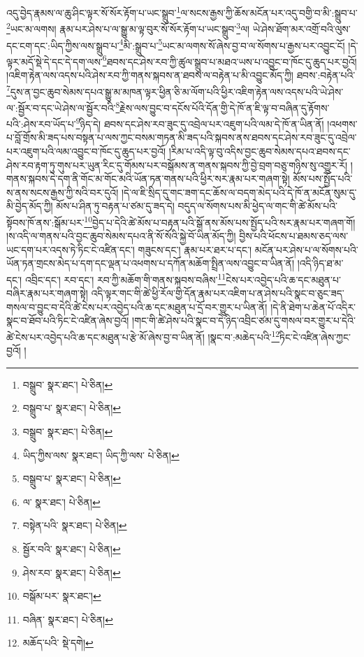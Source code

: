 འདུ་བྱེད་རྣམས་ལ་ཆུ་ཤིང་ལྟར་སོ་སོར་རྟོག་པ་ཡང་སྒྲུབ་\footnote{བསྒྲུབ་  སྣར་ཐང་།  པེ་ཅིན། }ལ་སངས་རྒྱས་ཀྱི་ཆོས་མངོན་པར་འདུ་བགྱི་བ་མི་:སྒྲུབ་པ་\footnote{བསྒྲུབ་པ་  སྣར་ཐང་།  པེ་ཅིན། }ཡང་མ་ལགས། རྣམ་པར་ཤེས་པ་ལ་སྒྱུ་མ་ལྟ་བུར་སོ་སོར་རྟོག་པ་ཡང་སྒྲུབ་\footnote{བསྒྲུབ་  སྣར་ཐང་།  པེ་ཅིན། }ལ། ཡེ་ཤེས་ཐོག་མར་འགྲོ་བའི་ལུས་དང་ངག་དང་:ཡིད་ཀྱིས་ལས་སྒྲུབ་པ་\footnote{ཡིད་ཀྱིས་ལས་  སྣར་ཐང་། ཡིད་ཀྱི་ལས་  པེ་ཅིན། }མི་:སྒྲུབ་པ་\footnote{བསྒྲུབ་པ་  སྣར་ཐང་།  པེ་ཅིན། }ཡང་མ་ལགས་སོ་ཞེས་བྱ་བ་ལ་སོགས་པ་རྒྱས་པར་འབྱུང་ངོ། །དེ་ལྟར་མདོ་སྡེ་དེ་དང་དེ་དག་ལས་\footnote{ལ་  སྣར་ཐང་།  པེ་ཅིན། }ཐབས་དང་ཤེས་རབ་ཀྱི་ཚུལ་སྒྲུབ་པ་མཐའ་ཡས་པ་འབྱུང་བ་ཁོང་དུ་ཆུད་པར་བྱའོ། །འཇིག་རྟེན་ལས་འདས་པའི་ཤེས་རབ་ཀྱི་གནས་སྐབས་ན་ཐབས་ལ་བརྟེན་པ་མི་འབྱུང་མོད་ཀྱི། ཐབས་:བརྟེན་པའི་\footnote{བསྟེན་པའི་  སྣར་ཐང་།  པེ་ཅིན། }དུས་ན་བྱང་ཆུབ་སེམས་དཔའ་སྒྱུ་མ་མཁན་ལྟར་ཕྱིན་ཅི་མ་ལོག་པའི་ཕྱིར་འཇིག་རྟེན་ལས་འདས་པའི་ཡེ་ཤེས་ལ་:སྦྱོར་བ་དང་ཡེ་ཤེས་ལ་སྦྱོར་བའི་\footnote{སྦྱོར་བའི་  སྣར་ཐང་།  པེ་ཅིན། }རྗེས་ལས་བྱུང་བ་དངོས་པོའི་དོན་གྱི་དེ་ཁོ་ན་ཇི་ལྟ་བ་བཞིན་དུ་རྟོགས་པའི་:ཤེས་རབ་ཡོད་པ་\footnote{ཤེས་རབ་  སྣར་ཐང་།  པེ་ཅིན། }ཉིད་དེ། ཐབས་དང་ཤེས་རབ་ཟུང་དུ་འབྲེལ་པར་འཇུག་པའི་ལམ་དེ་ཁོ་ན་ཡིན་ནོ། །འཕགས་པ་བློ་གྲོས་མི་ཟད་པས་བསྟན་པ་ལས་ཀྱང་བསམ་གཏན་མི་ཟད་པའི་སྐབས་ནས་ཐབས་དང་ཤེས་རབ་ཟུང་དུ་འབྲེལ་པར་འཇུག་པའི་ལམ་འབྱུང་བ་ཁོང་དུ་ཆུད་པར་བྱའོ། །རིམ་པ་འདི་ལྟ་བུ་འདིས་བྱང་ཆུབ་སེམས་དཔའ་ཐབས་དང་ཤེས་རབ་རྟག་ཏུ་གུས་པར་ཡུན་རིང་དུ་གོམས་པར་བསྒོམས་ན་གནས་སྐབས་ཀྱི་བྱེ་བྲག་བཅུ་གཉིས་སུ་འགྱུར་རོ། །གནས་སྐབས་དེ་དག་ནི་གོང་མ་གོང་མའི་ཡོན་ཏན་གནས་པའི་ཕྱིར་སར་རྣམ་པར་གཞག་སྟེ། མོས་པས་སྤྱོད་པའི་ས་ནས་སངས་རྒྱས་ཀྱི་སའི་བར་དུའོ། །དེ་ལ་ཇི་སྲིད་དུ་གང་ཟག་དང་ཆོས་ལ་བདག་མེད་པའི་དེ་ཁོ་ན་མངོན་སུམ་དུ་མི་བྱེད་མོད་ཀྱི། མོས་པ་ཤིན་ཏུ་བརྟན་པ་ཙམ་དུ་ཟད་དེ། བདུད་ལ་སོགས་པས་མི་ཕྱེད་ལ་གང་གི་ཚེ་མོས་པའི་སྟོབས་ཁོ་ནས་:སྒོམ་པར་\footnote{བསྒོམ་པར་  སྣར་ཐང་། }བྱེད་པ་དེའི་ཚེ་མོས་པ་བརྟན་པའི་སྒོ་ནས་མོས་པས་སྤྱོད་པའི་སར་རྣམ་པར་གཞག་གོ། །ས་འདི་ལ་གནས་པའི་བྱང་ཆུབ་སེམས་དཔའ་ནི་སོ་སོའི་སྐྱེ་བོ་ཡིན་མོད་ཀྱི། བྱིས་པའི་ཕོངས་པ་ཐམས་ཅད་ལས་ཡང་དག་པར་འདས་ཏེ་ཏིང་ངེ་འཛིན་དང་། གཟུངས་དང་། རྣམ་པར་ཐར་པ་དང་། མངོན་པར་ཤེས་པ་ལ་སོགས་པའི་ཡོན་ཏན་གྲངས་མེད་པ་དག་དང་ལྡན་པ་འཕགས་པ་དཀོན་མཆོག་སྤྲིན་ལས་འབྱུང་བ་ཡིན་ནོ། །འདི་ཉིད་ཐ་མ་དང་། འབྲིང་དང་། རབ་དང་། རབ་ཀྱི་མཆོག་གི་གནས་སྐབས་བཞིས་\footnote{བཞིན་  སྣར་ཐང་།  པེ་ཅིན། }ངེས་པར་འབྱེད་པའི་ཆ་དང་མཐུན་པ་བཞིར་རྣམ་པར་གཞག་སྟེ། འདི་ལྟར་གང་གི་ཚེ་ཕྱི་རོལ་གྱི་དོན་རྣམ་པར་འཇིག་པ་ན་ཤེས་པའི་སྣང་བ་ཅུང་ཟད་གསལ་བ་བྱུང་བ་དེའི་ཚེ་ངེས་པར་འབྱེད་པའི་ཆ་དང་མཐུན་པ་དྲོ་བར་གྱུར་པ་ཡིན་ནོ། །དེ་ནི་ཐེག་པ་ཆེན་པོ་འདིར་སྣང་བ་ཐོབ་པའི་ཏིང་ངེ་འཛིན་ཞེས་བྱའོ། །གང་གི་ཚེ་ཤེས་པའི་སྣང་བ་དེ་ཉིད་འབྲིང་ཙམ་དུ་གསལ་བར་གྱུར་པ་དེའི་ཚེ་ངེས་པར་འབྱེད་པའི་ཆ་དང་མཐུན་པ་རྩེ་མོ་ཞེས་བྱ་བ་ཡིན་ནོ། །སྣང་བ་:མཆེད་པའི་\footnote{མཆོད་པའི་  སྡེ་དགེ། }ཏིང་ངེ་འཛིན་ཞེས་ཀྱང་བྱའོ། །
